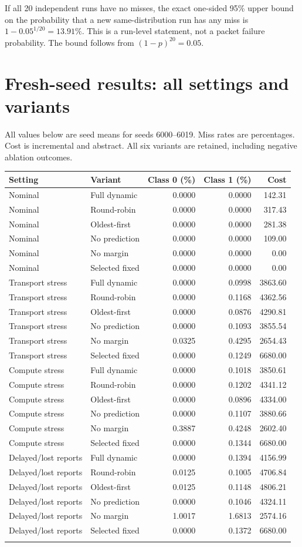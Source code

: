 \documentclass[10pt,a4paper]{article}
\newcommand{\page}[1]{\clearpage\section{#1}}
\begin{document}
If all 20 independent runs have no misses, the exact one-sided 95\% upper bound
on the probability that a new same-distribution run has any miss is
$1-0.05^{1/20}=13.91\%$. This is a run-level statement, not a packet failure
probability. The bound follows from $(1-p)^{20}=0.05$.

\page{Fresh-seed results: all settings and variants}
All values below are seed means for seeds 6000--6019. Miss rates are percentages.
Cost is incremental and abstract. All six variants are retained, including
negative ablation outcomes.
\begin{center}\footnotesize
\begin{tabular}{llrrr}\toprule
Setting & Variant & Class 0 (\%) & Class 1 (\%) & Cost\\\midrule
Nominal & Full dynamic & 0.0000 & 0.0000 & 142.31 \\
Nominal & Round-robin & 0.0000 & 0.0000 & 317.43 \\
Nominal & Oldest-first & 0.0000 & 0.0000 & 281.38 \\
Nominal & No prediction & 0.0000 & 0.0000 & 109.00 \\
Nominal & No margin & 0.0000 & 0.0000 & 0.00 \\
Nominal & Selected fixed & 0.0000 & 0.0000 & 0.00 \\
\addlinespace
Transport stress & Full dynamic & 0.0000 & 0.0998 & 3863.60 \\
Transport stress & Round-robin & 0.0000 & 0.1168 & 4362.56 \\
Transport stress & Oldest-first & 0.0000 & 0.0876 & 4290.81 \\
Transport stress & No prediction & 0.0000 & 0.1093 & 3855.54 \\
Transport stress & No margin & 0.0325 & 0.4295 & 2654.43 \\
Transport stress & Selected fixed & 0.0000 & 0.1249 & 6680.00 \\
\addlinespace
Compute stress & Full dynamic & 0.0000 & 0.1018 & 3850.61 \\
Compute stress & Round-robin & 0.0000 & 0.1202 & 4341.12 \\
Compute stress & Oldest-first & 0.0000 & 0.0896 & 4334.00 \\
Compute stress & No prediction & 0.0000 & 0.1107 & 3880.66 \\
Compute stress & No margin & 0.3887 & 0.4248 & 2602.40 \\
Compute stress & Selected fixed & 0.0000 & 0.1344 & 6680.00 \\
\addlinespace
Delayed/lost reports & Full dynamic & 0.0000 & 0.1394 & 4156.99 \\
Delayed/lost reports & Round-robin & 0.0125 & 0.1005 & 4706.84 \\
Delayed/lost reports & Oldest-first & 0.0125 & 0.1148 & 4806.21 \\
Delayed/lost reports & No prediction & 0.0000 & 0.1046 & 4324.11 \\
Delayed/lost reports & No margin & 1.0017 & 1.6813 & 2574.16 \\
Delayed/lost reports & Selected fixed & 0.0000 & 0.1372 & 6680.00 \\
\addlinespace
\bottomrule\end{tabular}\end{center}
\end{document}
